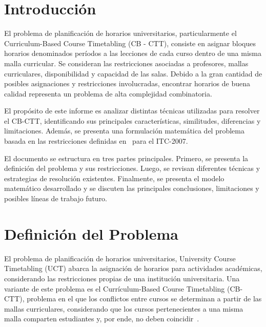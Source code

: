 \documentclass[letter, 10pt]{article}
\begin{document}
\section{Introducci\'on}
El problema de planificaci\'on de horarios universitarios, particularmente el Curriculum-Based Course Timetabling (CB - CTT), consiste en asignar bloques horarios denominados per\'iodos a las lecciones de cada curso dentro de una misma malla curricular. Se consideran las restricciones asociadas a profesores, mallas curriculares, disponibilidad y capacidad de las salas. Debido a la gran cantidad de posibles asignaciones y restricciones involucradas, encontrar horarios de buena calidad representa un problema de alta complejidad combinatoria.

El prop\'osito de este informe es analizar distintas t\'ecnicas utilizadas para resolver el CB-CTT, identificando sus principales caracter\'isticas, similitudes, diferencias y limitaciones. Adem\'as, se presenta una formulaci\'on matem\'atica del problema basada en las restricciones definidas en~\cite{DiGaspero2007ITC, Hao2011LowerBounds} para el ITC-2007.

El documento se estructura en tres partes principales. Primero, se presenta la definici\'on del problema y sus restricciones. Luego, se revisan diferentes t\'ecnicas y estrategias de resoluci\'on existentes. Finalmente, se presenta el modelo matem\'atico desarrollado y se discuten las principales conclusiones, limitaciones y posibles l\'ineas de trabajo futuro.

\section{Definici\'on del Problema}
El problema de planificaci\'on de horarios universitarios, University Course Timetabling (UCT)  abarca la asignaci\'on de horarios para actividades acad\'emicas, considerando las restricciones propias de una instituci\'on universitaria. Una variante de este problema es el Curr\'iculum-Based Course Timetabling (CB-CTT), problema en el que los conflictos entre cursos se determinan a partir de las mallas curriculares, considerando que los cursos pertenecientes a una misma malla comparten estudiantes y, por ende, no deben coincidir~\cite{DiGaspero2007ITC}.
\end{document}
